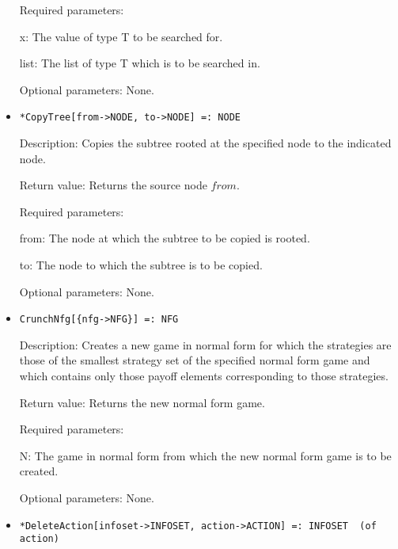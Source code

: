 \begin{itemize}
\item[Required parameters:]\hfil\null
	
\bd
\item	
[x:] The value of type T to be searched for.
\item
[list:] The list of type T which is to be searched in.
\ed

\item
[Optional parameters:] None.
\ed


\item
\protect \large \begin{verbatim}
*CopyTree[from->NODE, to->NODE] =: NODE
\end{verbatim}\normalsize

\bd
\item
[Description:] Copies the subtree rooted at the specified node to the
indicated node.
\item
[Return value:] Returns the source node $from$.
\item
[Required parameters:]\hfil\null

\bd
\item	
[from:] The node at which the subtree to be copied is rooted.
\item
[to:] The node to which the subtree is to be copied.
\ed

\item
[Optional parameters:] None.
\ed

\item
\protect \large \begin{verbatim}
CrunchNfg[{nfg->NFG}] =: NFG
\end{verbatim}\normalsize

\bd
\item
[Description:] Creates a new game in normal form for which the
strategies are those of the smallest strategy set of the specified
normal form game and which contains only those payoff elements
corresponding to those strategies.
\item
[Return value:] Returns the new normal form game.
\item
[Required parameters:]\hfil\null
	
\bd
\item
[N:] The game in normal form from which the new normal form game
is to be created.
\ed

\item  
[Optional parameters:] None.
\ed


\item
\protect \large \begin{verbatim}
*DeleteAction[infoset->INFOSET, action->ACTION] =: INFOSET  (of action)
\end{verbatim}\normalsize


\end{itemize}
